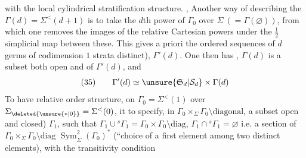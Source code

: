 with the local  cylindrical stratification
structure. , Another way of
describing the $\Gamma(d)=\Sigma^{<}(d+1)$ is to
take the   $d$th power of $\Gamma_0$\deleted{\unsure{$(\varnothing)$}}
over $\Sigma\ (=\Gamma(\varnothing))$, from which one removes the images
of the  relative Cartesian powers  under the
$\tfrac12$ simplicial map between these. This gives a priori
the  ordered sequences of $d$ germs of
codimension $1$ strata   distinct), 
$\Gamma'(d)$. One then has ,
$\Gamma(d)$ is a subset both open and
 of $\Gamma'(d)$, and 
\[
(35)\qquad \Gamma'(d)\simeq\unsure{\mathfrak S_d|\mathcal S_d}\times\Gamma(d)
\]
To have  relative  order structure, on
 $\Gamma_0=\Sigma^{<}(1)$ over $\Sigma_{\deleted{\unsure{*|0}}}=\Sigma^{<}(0)$, it 
to specify,  in
$\Gamma_0\times_\Sigma\Gamma_0\setminus\text{diagonal}$, a subset  open and closed)
$\Gamma_1$, such that $\Gamma_1\cup{}^s\Gamma_1=\Gamma_0\times\Gamma_0\setminus\text{diag}$, $\Gamma_1\cap{}^s\Gamma_1=\varnothing$
i.e. a section of $\Gamma_0\times_\Sigma\Gamma_0\setminus\text{diag}$ 
$\operatorname{Sym}^2_\Sigma(\Gamma_0)^*$ (``choice of a first element among two
distinct elements), with the transitivity condition
